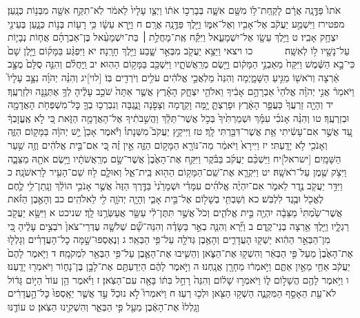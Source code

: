 \documentclass[twoside, openany, parskip=half, 11pt]{book}
\begin{document}
אֹתוֹ֙ פַּדֶּ֣נָֽה אֲרָ֔ם לָקַֽחַת־ל֥וֹ מִשָּׁ֖ם אִשָּׁ֑ה בְּבָרְכ֣וֹ אֹת֔וֹ וַיְצַ֤ו עָלָיו֙ לֵאמֹ֔ר לֹֽא־תִקַּ֥ח אִשָּׁ֖ה מִבְּנ֥וֹת כְּנָֽעַן׃ מפטירז וַיִּשְׁמַ֣ע יַעֲקֹ֔ב אֶל־אָבִ֖יו וְאֶל־אִמּ֑וֹ וַיֵּ֖לֶךְ פַּדֶּ֥נָֽה אֲרָֽם׃ ח וַיַּ֣רְא עֵשָׂ֔ו כִּ֥י רָע֖וֹת בְּנ֣וֹת כְּנָ֑עַן בְּעֵינֵ֖י יִצְחָ֥ק אָבִֽיו׃ ט וַיֵּ֥לֶךְ עֵשָׂ֖ו אֶל־יִשְׁמָעֵ֑אל וַיִּקַּ֡ח אֶֽת־מָחֲלַ֣ת ׀ בַּת־יִשְׁמָעֵ֨אל בֶּן־אַבְרָהָ֜ם אֲח֧וֹת נְבָי֛וֹת עַל־נָשָׁ֖יו ל֥וֹ לְאִשָּֽׁה׃
　　　כו ויצאי וַיֵּצֵ֥א יַעֲקֹ֖ב מִבְּאֵ֣ר שָׁ֑בַע וַיֵּ֖לֶךְ חָרָֽנָה׃ יא וַיִּפְגַּ֨ע בַּמָּק֜וֹם וַיָּ֤לֶן שָׁם֙ כִּי־בָ֣א הַשֶּׁ֔מֶשׁ וַיִּקַּח֙ מֵאַבְנֵ֣י הַמָּק֔וֹם וַיָּ֖שֶׂם מְרַֽאֲשֹׁתָ֑יו וַיִּשְׁכַּ֖ב בַּמָּק֥וֹם הַהֽוּא׃ יב וַֽיַּחֲלֹ֗ם וְהִנֵּ֤ה סֻלָּם֙ מֻצָּ֣ב אַ֔רְצָה וְרֹאשׁ֖וֹ מַגִּ֣יעַ הַשָּׁמָ֑יְמָה וְהִנֵּה֙ מַלְאֲכֵ֣י אֱלֹהִ֔ים עֹלִ֥ים וְיֹרְדִ֖ים בּֽוֹ׃ [לוי]יג וְהִנֵּ֨ה יְהֹוָ֜ה נִצָּ֣ב עָלָיו֮ וַיֹּאמַר֒ אֲנִ֣י יְהֹוָ֗ה אֱלֹהֵי֙ אַבְרָהָ֣ם אָבִ֔יךָ וֵאלֹהֵ֖י יִצְחָ֑ק הָאָ֗רֶץ אֲשֶׁ֤ר אַתָּה֙ שֹׁכֵ֣ב עָלֶ֔יהָ לְךָ֥ אֶתְּנֶ֖נָּה וּלְזַרְעֶֽךָ׃ יד וְהָיָ֤ה זַרְעֲךָ֙ כַּעֲפַ֣ר הָאָ֔רֶץ וּפָרַצְתָּ֛ יָ֥מָּה וָקֵ֖דְמָה וְצָפֹ֣נָה וָנֶ֑גְבָּה וְנִבְרְכ֥וּ בְךָ֛ כׇּל־מִשְׁפְּחֹ֥ת הָאֲדָמָ֖ה וּבְזַרְעֶֽךָ׃ טו וְהִנֵּ֨ה אָנֹכִ֜י עִמָּ֗ךְ וּשְׁמַרְתִּ֙יךָ֙ בְּכֹ֣ל אֲשֶׁר־תֵּלֵ֔ךְ וַהֲשִׁ֣בֹתִ֔יךָ אֶל־הָאֲדָמָ֖ה הַזֹּ֑את כִּ֚י לֹ֣א אֶֽעֱזָבְךָ֔ עַ֚ד אֲשֶׁ֣ר אִם־עָשִׂ֔יתִי אֵ֥ת אֲשֶׁר־דִּבַּ֖רְתִּי לָֽךְ׃ טז וַיִּיקַ֣ץ יַעֲקֹב֮ מִשְּׁנָתוֹ֒ וַיֹּ֕אמֶר אָכֵן֙ יֵ֣שׁ יְהֹוָ֔ה בַּמָּק֖וֹם הַזֶּ֑ה וְאָנֹכִ֖י לֹ֥א יָדָֽעְתִּי׃ יז וַיִּירָא֙ וַיֹּאמַ֔ר מַה־נּוֹרָ֖א הַמָּק֣וֹם הַזֶּ֑ה אֵ֣ין זֶ֗ה כִּ֚י אִם־בֵּ֣ית אֱלֹהִ֔ים וְזֶ֖ה שַׁ֥עַר הַשָּׁמָֽיִם׃ [ישראל]יח וַיַּשְׁכֵּ֨ם יַעֲקֹ֜ב בַּבֹּ֗קֶר וַיִּקַּ֤ח אֶת־הָאֶ֙בֶן֙ אֲשֶׁר־שָׂ֣ם מְרַֽאֲשֹׁתָ֔יו וַיָּ֥שֶׂם אֹתָ֖הּ מַצֵּבָ֑ה וַיִּצֹ֥ק שֶׁ֖מֶן עַל־רֹאשָֽׁהּ׃ יט וַיִּקְרָ֛א אֶת־שֵֽׁם־הַמָּק֥וֹם הַה֖וּא בֵּֽית־אֵ֑ל וְאוּלָ֛ם ל֥וּז שֵׁם־הָעִ֖יר לָרִאשֹׁנָֽה׃ כ וַיִּדַּ֥ר יַעֲקֹ֖ב נֶ֣דֶר לֵאמֹ֑ר אִם־יִהְיֶ֨ה אֱלֹהִ֜ים עִמָּדִ֗י וּשְׁמָרַ֙נִי֙ בַּדֶּ֤רֶךְ הַזֶּה֙ אֲשֶׁ֣ר אָנֹכִ֣י הוֹלֵ֔ךְ וְנָֽתַן־לִ֥י לֶ֛חֶם לֶאֱכֹ֖ל וּבֶ֥גֶד לִלְבֹּֽשׁ׃ כא וְשַׁבְתִּ֥י בְשָׁל֖וֹם אֶל־בֵּ֣ית אָבִ֑י וְהָיָ֧ה יְהֹוָ֛ה לִ֖י לֵאלֹהִֽים׃ כב וְהָאֶ֣בֶן הַזֹּ֗את אֲשֶׁר־שַׂ֙מְתִּי֙ מַצֵּבָ֔ה יִהְיֶ֖ה בֵּ֣ית אֱלֹהִ֑ים וְכֹל֙ אֲשֶׁ֣ר תִּתֶּן־לִ֔י עַשֵּׂ֖ר אֲעַשְּׂרֶ֥נּוּ לָֽךְ׃ שניכט א וַיִּשָּׂ֥א יַעֲקֹ֖ב רַגְלָ֑יו וַיֵּ֖לֶךְ אַ֥רְצָה בְנֵי־קֶֽדֶם׃ ב וַיַּ֞רְא וְהִנֵּ֧ה בְאֵ֣ר בַּשָּׂדֶ֗ה וְהִנֵּה־שָׁ֞ם שְׁלֹשָׁ֤ה עֶדְרֵי־צֹאן֙ רֹבְצִ֣ים עָלֶ֔יהָ כִּ֚י מִן־הַבְּאֵ֣ר הַהִ֔וא יַשְׁק֖וּ הָעֲדָרִ֑ים וְהָאֶ֥בֶן גְּדֹלָ֖ה עַל־פִּ֥י הַבְּאֵֽר׃ ג וְנֶאֶסְפוּ־שָׁ֣מָּה כׇל־הָעֲדָרִ֗ים וְגָלְל֤וּ אֶת־הָאֶ֙בֶן֙ מֵעַל֙ פִּ֣י הַבְּאֵ֔ר וְהִשְׁק֖וּ אֶת־הַצֹּ֑אן וְהֵשִׁ֧יבוּ אֶת־הָאֶ֛בֶן עַל־פִּ֥י הַבְּאֵ֖ר לִמְקֹמָֽהּ׃ ד וַיֹּ֤אמֶר לָהֶם֙ יַעֲקֹ֔ב אַחַ֖י מֵאַ֣יִן אַתֶּ֑ם וַיֹּ֣אמְר֔וּ מֵחָרָ֖ן אֲנָֽחְנוּ׃ ה וַיֹּ֣אמֶר לָהֶ֔ם הַיְדַעְתֶּ֖ם אֶת־לָבָ֣ן בֶּן־נָח֑וֹר וַיֹּאמְר֖וּ יָדָֽעְנוּ׃ ו וַיֹּ֥אמֶר לָהֶ֖ם הֲשָׁל֣וֹם ל֑וֹ וַיֹּאמְר֣וּ שָׁל֔וֹם וְהִנֵּה֙ רָחֵ֣ל בִּתּ֔וֹ בָּאָ֖ה עִם־הַצֹּֽאן׃ ז וַיֹּ֗אמֶר הֵ֥ן עוֹד֙ הַיּ֣וֹם גָּד֔וֹל לֹא־עֵ֖ת הֵאָסֵ֣ף הַמִּקְנֶ֑ה הַשְׁק֥וּ הַצֹּ֖אן וּלְכ֥וּ רְעֽוּ׃ ח וַיֹּאמְרוּ֮ לֹ֣א נוּכַל֒ עַ֣ד אֲשֶׁ֤ר יֵאָֽסְפוּ֙ כׇּל־הָ֣עֲדָרִ֔ים וְגָֽלְלוּ֙ אֶת־הָאֶ֔בֶן מֵעַ֖ל פִּ֣י הַבְּאֵ֑ר וְהִשְׁקִ֖ינוּ הַצֹּֽאן׃ ט עוֹדֶ֖נּוּ 
\end{document}
